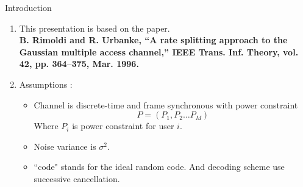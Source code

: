 \documentclass[10pt]{beamer}
\begin{document}
	\begin{frame}[t]{Introduction}\vspace{5pt}
		\begin{enumerate}
			\item <1->This presentation is based on the paper.\\
			\small{\textbf{ B. Rimoldi and R. Urbanke, “A rate splitting approach to the Gaussian
					multiple access channel,” IEEE Trans. Inf. Theory, vol. 42, pp. 364–375,
					Mar. 1996.}}\\
	

		\item<2-> Assumptions :
		\begin{itemize}
			\item Channel is discrete-time and frame synchronous with power constraint \begin{equation}
				P = \left( P_1, P_2 \dots P_M \right)
			\end{equation}
		Where $P_i$ is power constraint for user $i$.
			\item Noise variance is $\sigma^2$.
			\item ``code" stands for the ideal random code. And decoding scheme use successive cancellation.
			
		\end{itemize}
	
			\end{enumerate}
	\end{frame}
	
\end{document}

